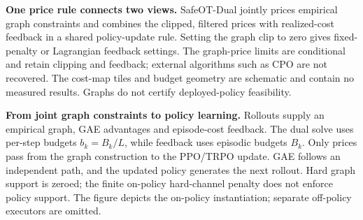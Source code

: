 \textbf{One price rule connects two views.} SafeOT-Dual jointly prices empirical
graph constraints and combines the clipped, filtered prices with realized-cost
feedback in a shared policy-update rule. Setting the graph clip to zero gives
fixed-penalty or Lagrangian feedback settings. The graph-price limits are conditional
and retain clipping and feedback; external algorithms such as CPO are not recovered.
The cost-map tiles and budget geometry are schematic and contain no measured
results. Graphs do not certify deployed-policy feasibility.

\textbf{From joint graph constraints to policy learning.} Rollouts supply an
empirical graph, GAE advantages and episode-cost feedback. The dual solve uses
per-step budgets $b_k=B_k/L$, while feedback uses episodic budgets $B_k$. Only
prices pass from the graph construction to the PPO/TRPO update. GAE follows an
independent path, and the updated policy generates the next rollout. Hard graph support is zeroed; the finite on-policy hard-channel penalty does not enforce policy support. The figure
depicts the on-policy instantiation; separate off-policy executors are omitted.
